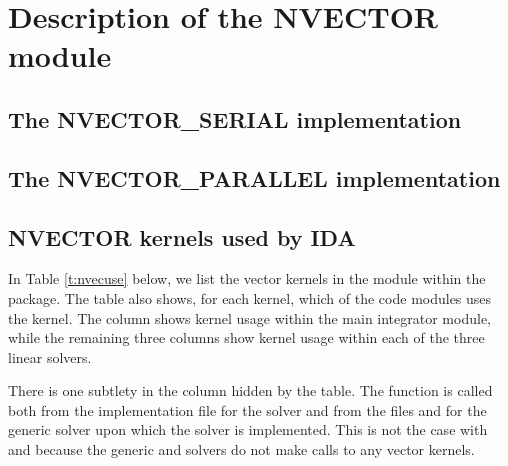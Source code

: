 \chapter{Description of the NVECTOR module}\label{s:nvector}


\section{The NVECTOR\_SERIAL implementation}\label{ss:nvec_ser}


\section{The NVECTOR\_PARALLEL implementation}\label{ss:nvec_par}


\section{NVECTOR kernels used by IDA}

In Table \ref{t:nvecuse} below, we list the vector kernels in the 
{\nvector} module within the {\ida} package.
The table also shows, for each kernel, which of the code modules uses
the kernel. The {\ida} column shows kernel usage within the main
integrator module, while the remaining three columns show kernel usage
within each of the three {\ida} linear solvers. 

There is one subtlety in the {\idaspgmr} column hidden by the table. 
The  function is called both from the 
implementation file  for the {\idaspgmr} solver and from
the files  and  for the generic {\spgmr} 
solver upon which the {\idaspgmr} solver is implemented. 
This is not the case with {\idadense} and {\idaband}
because the generic {\dense} and {\band} solvers 
do not make calls to any vector kernels.

